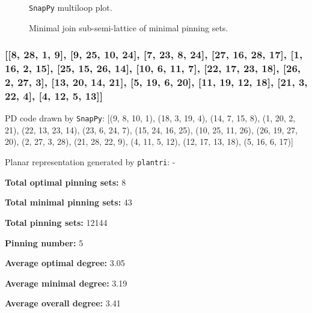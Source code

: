 \documentclass{article}%
\begin{document}
\begin{multicols}{2}
\begin{figure}[H]
\centering

\caption{\texttt{SnapPy} multiloop plot.}
\label{fig:tex/img/[[21, 28, 22, 1], [7, 20, 8, 21], [4, 27, 5, 28], [22, 5, 23, 6], [1, 6, 2, 7], [2, 19, 3, 20], [8, 3, 9, 4], [15, 26, 16, 27], [23, 12, 24, 13], [13, 18, 14, 19], [9, 14, 10, 15], [10, 25, 11, 26], [.svg}
\end{figure}
\columnbreak

\begin{figure}[H]
\centering
\scalebox{0.8}{}
\caption{Minimal join sub-semi-lattice of minimal pinning sets.}
\label{fig:tex/img/[[21, 28, 22, 1], [7, 20, 8, 21], [4, 27, 5, 28], [22, 5, 23, 6], [1, 6, 2, 7], [2, 19, 3, 20], [8, 3, 9, 4], [15, 26, 16, 27], [23, 12, 24, 13], [13, 18, 14, 19], [9, 14, 10, 15], [10, 25, 11, 26], [.pgf}
\end{figure}
\end{multicols}

\newpage

\subsubsection{[[8, 28, 1, 9], [9, 25, 10, 24], [7, 23, 8, 24], [27, 16, 28, 17], [1, 16, 2, 15], [25, 15, 26, 14], [10, 6, 11, 7], [22, 17, 23, 18], [26, 2, 27, 3], [13, 20, 14, 21], [5, 19, 6, 20], [11, 19, 12, 18], [21, 3, 22, 4], [4, 12, 5, 13]]}

{\small\noindent PD code drawn by \texttt{SnapPy}: [(9, 8, 10, 1), (18, 3, 19, 4), (14, 7, 15, 8), (1, 20, 2, 21), (22, 13, 23, 14), (23, 6, 24, 7), (15, 24, 16, 25), (10, 25, 11, 26), (26, 19, 27, 20), (2, 27, 3, 28), (21, 28, 22, 9), (4, 11, 5, 12), (12, 17, 13, 18), (5, 16, 6, 17)]}

{\small\noindent Planar representation generated by \texttt{plantri}: -}

\begin{multicols}{2}
{\normalsize \noindent\textbf{Total optimal pinning sets:} 8

\noindent\textbf{Total minimal pinning sets:} 43

\noindent\textbf{Total pinning sets:} 12144

\noindent\textbf{Pinning number:} 5

}
\columnbreak

{\normalsize \noindent\textbf{Average optimal degree:} 3.05

\noindent\textbf{Average minimal degree:} 3.19

\noindent\textbf{Average overall degree:} 3.41

}
\end{multicols}
\end{document}
